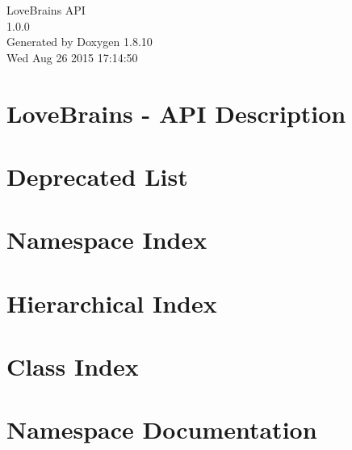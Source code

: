 \documentclass[twoside]{book}
\newcommand{\+}{\discretionary{\mbox{\scriptsize$\hookleftarrow$}}{}{}}
\newcommand{\clearemptydoublepage}{%
  \newpage{\pagestyle{empty}\cleardoublepage}%
}
\begin{document}
\hypersetup{pageanchor=false,
             bookmarks=true,
             bookmarksnumbered=true,
             pdfencoding=unicode
            }
\begin{titlepage}
\vspace*{7cm}
\begin{center}%
{\Large Love\+Brains A\+P\+I \\[1ex]\large 1.\+0.\+0 }\\
\vspace*{1cm}
{\large Generated by Doxygen 1.8.10}\\
\vspace*{0.5cm}
{\small Wed Aug 26 2015 17:14:50}\\
\end{center}
\end{titlepage}
\clearemptydoublepage
\tableofcontents
\clearemptydoublepage
{}
\hypersetup{pageanchor=true}

\chapter{Love\+Brains -\/ A\+P\+I Description}
\label{md__home_robin_f__programming__git__c_p_p__love_brains_api__r_e_a_d_m_e}
\hypertarget{md__home_robin_f__programming__git__c_p_p__love_brains_api__r_e_a_d_m_e}{}

\chapter{Deprecated List}
\label{deprecated}
\hypertarget{deprecated}{}

\chapter{Namespace Index}

\chapter{Hierarchical Index}

\chapter{Class Index}

\chapter{Namespace Documentation}

\end{document}
